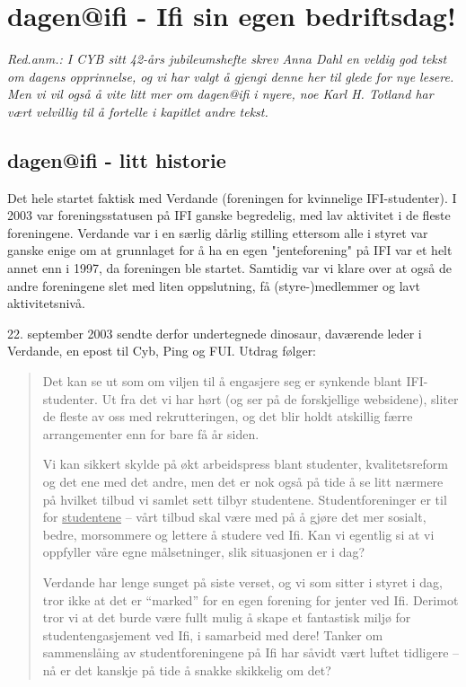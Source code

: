 \chapter{dagen@ifi - Ifi sin egen bedriftsdag!}

\textit{Red.anm.: I CYB sitt 42-års jubileumshefte skrev Anna Dahl en veldig god tekst om dagens opprinnelse, og vi har valgt å gjengi denne her til glede for nye lesere. Men vi vil også å vite litt mer om dagen@ifi i nyere, noe Karl H. Totland har vært velvillig til å fortelle i kapitlet andre tekst.}

\section{dagen@ifi - litt historie}

\author{Skrevet av Anna Dahl}

Det hele startet faktisk med Verdande (foreningen for kvinnelige IFI-studenter). I 2003 var foreningsstatusen på IFI ganske begredelig, med lav aktivitet i de fleste foreningene. Verdande var i en særlig dårlig stilling ettersom alle i styret var ganske enige om at grunnlaget for å ha en egen "jenteforening" på IFI var et helt annet enn i 1997, da foreningen ble startet. Samtidig var vi klare over at også de andre foreningene slet med liten oppslutning, få (styre-)medlemmer og lavt aktivitetsnivå.

22. september 2003 sendte derfor undertegnede dinosaur, daværende leder i Verdande, en epost til Cyb, Ping og FUI. Utdrag følger:

\begin{quote}
	Det kan se ut som om viljen til å engasjere seg er synkende blant IFI-studenter. Ut fra det vi har hørt (og ser på de forskjellige websidene), sliter de fleste av oss med rekrutteringen, og det blir holdt atskillig færre arrangementer enn for bare få år siden.
	
	Vi kan sikkert skylde på økt arbeidspress blant studenter, kvalitetsreform og det ene med det andre, men det er nok også på tide å se litt nærmere på hvilket tilbud vi samlet sett tilbyr studentene. Studentforeninger er til for \underline{studentene} -- vårt tilbud skal være med på å gjøre det mer sosialt, bedre, morsommere og lettere å studere ved Ifi. Kan vi egentlig si at vi oppfyller våre egne målsetninger, slik situasjonen er i dag?
	
	Verdande har lenge sunget på siste verset, og vi som sitter i styret i dag, tror ikke at det er ``marked'' for en egen forening for jenter ved Ifi. Derimot tror vi at det burde være fullt mulig å skape et fantastisk miljø for studentengasjement ved Ifi, i samarbeid med dere! Tanker om sammenslåing av studentforeningene på Ifi har såvidt vært luftet tidligere -- nå er det kanskje på tide å snakke skikkelig om det?
\end{quote}

